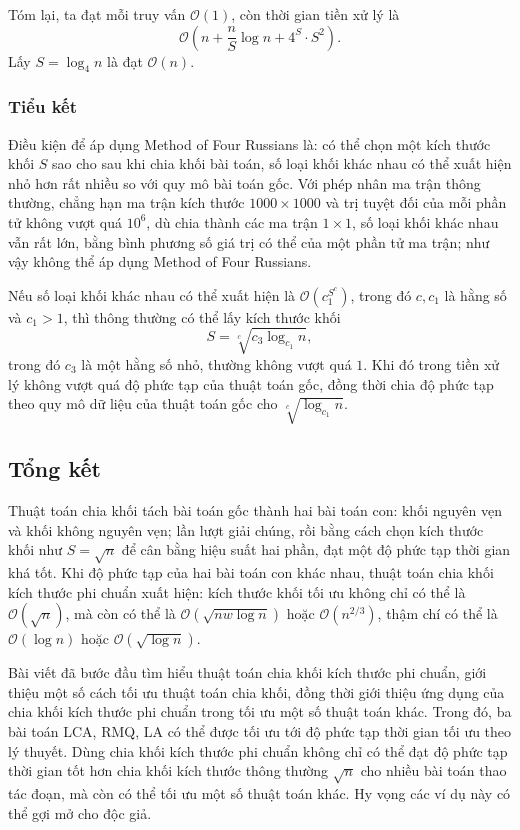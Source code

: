 \documentclass[11pt]{article}
\newcommand{\Oh}{\mathcal{O}}
\begin{document}
Tóm lại, ta đạt mỗi truy vấn \(\Oh(1)\), còn thời gian tiền xử lý là
\[
  \Oh\left(n+\frac nS\log n+4^S\cdot S^2\right).
\]
Lấy \(S=\log_4 n\) là đạt \(\Oh(n)\).

\subsubsection{Tiểu kết}

Điều kiện để áp dụng Method of Four Russians là: có thể chọn một kích thước
khối \(S\) sao cho sau khi chia khối bài toán, số loại khối khác nhau có thể
xuất hiện nhỏ hơn rất nhiều so với quy mô bài toán gốc. Với phép nhân ma trận
thông thường, chẳng hạn ma trận kích thước \(1000\times 1000\) và trị tuyệt
đối của mỗi phần tử không vượt quá \(10^6\), dù chia thành các ma trận
\(1\times1\), số loại khối khác nhau vẫn rất lớn, bằng bình phương số giá trị
có thể của một phần tử ma trận; như vậy không thể áp dụng Method of Four
Russians.

Nếu số loại khối khác nhau có thể xuất hiện là \(\Oh(c_1^{S^c})\), trong đó
\(c,c_1\) là hằng số và \(c_1>1\), thì thông thường có thể lấy kích thước khối
\[
  S=\sqrt[c]{c_3\log_{c_1}n},
\]
trong đó \(c_3\) là một hằng số nhỏ, thường không vượt quá \(1\). Khi đó trong
tiền xử lý không vượt quá độ phức tạp của thuật toán gốc, đồng thời chia độ
phức tạp theo quy mô dữ liệu của thuật toán gốc cho
\(\sqrt[c]{\log_{c_1}n}\).

\subsection{Tổng kết}

Thuật toán chia khối tách bài toán gốc thành hai bài toán con: khối nguyên vẹn
và khối không nguyên vẹn; lần lượt giải chúng, rồi bằng cách chọn kích thước
khối như \(S=\sqrt n\) để cân bằng hiệu suất hai phần, đạt một độ phức tạp
thời gian khá tốt. Khi độ phức tạp của hai bài toán con khác nhau, thuật toán
chia khối kích thước phi chuẩn xuất hiện: kích thước khối tối ưu không chỉ có
thể là \(\Oh(\sqrt n)\), mà còn có thể là \(\Oh(\sqrt{nw\log n})\) hoặc
\(\Oh(n^{2/3})\), thậm chí có thể là \(\Oh(\log n)\) hoặc \(\Oh(\sqrt{\log n})\).

Bài viết đã bước đầu tìm hiểu thuật toán chia khối kích thước phi chuẩn, giới
thiệu một số cách tối ưu thuật toán chia khối, đồng thời giới thiệu ứng dụng
của chia khối kích thước phi chuẩn trong tối ưu một số thuật toán khác. Trong
đó, ba bài toán LCA, RMQ, LA có thể được tối ưu tới độ phức tạp thời gian tối
ưu theo lý thuyết. Dùng chia khối kích thước phi chuẩn không chỉ có thể đạt độ
phức tạp thời gian tốt hơn chia khối kích thước thông thường \(\sqrt n\) cho
nhiều bài toán thao tác đoạn, mà còn có thể tối ưu một số thuật toán khác. Hy
vọng các ví dụ này có thể gợi mở cho độc giả.
\end{document}
